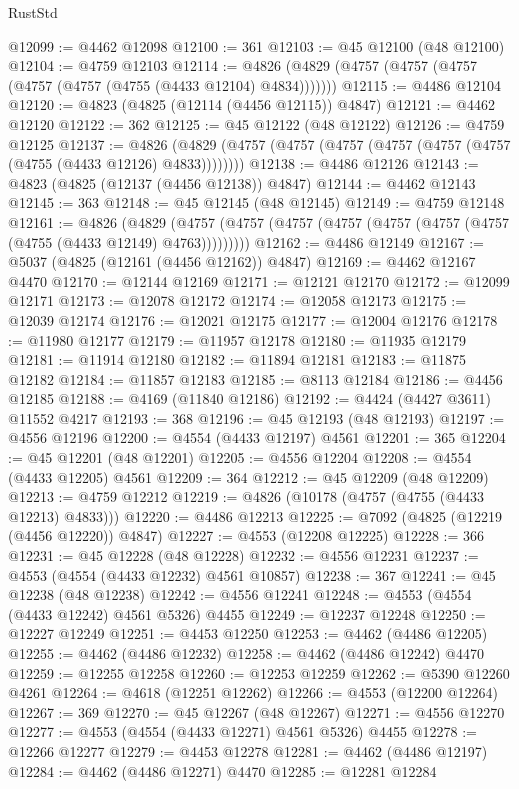 \begin{lexlean}{RustStd}
\begin{coremodule}
@12099 := @4462 @12098
@12100 := 361
@12103 := @45 @12100 (@48 @12100)
@12104 := @4759 @12103
@12114 := @4826 (@4829 (@4757 (@4757 (@4757 (@4757 (@4757 (@4755 (@4433 @12104) @4834)))))))
@12115 := @4486 @12104
@12120 := @4823 (@4825 (@12114 (@4456 @12115)) @4847)
@12121 := @4462 @12120
@12122 := 362
@12125 := @45 @12122 (@48 @12122)
@12126 := @4759 @12125
@12137 := @4826 (@4829 (@4757 (@4757 (@4757 (@4757 (@4757 (@4757 (@4755 (@4433 @12126) @4833))))))))
@12138 := @4486 @12126
@12143 := @4823 (@4825 (@12137 (@4456 @12138)) @4847)
@12144 := @4462 @12143
@12145 := 363
@12148 := @45 @12145 (@48 @12145)
@12149 := @4759 @12148
@12161 := @4826
    (@4829 (@4757 (@4757 (@4757 (@4757 (@4757 (@4757 (@4757 (@4755 (@4433 @12149) @4763)))))))))
@12162 := @4486 @12149
@12167 := @5037 (@4825 (@12161 (@4456 @12162)) @4847)
@12169 := @4462 @12167 @4470
@12170 := @12144 @12169
@12171 := @12121 @12170
@12172 := @12099 @12171
@12173 := @12078 @12172
@12174 := @12058 @12173
@12175 := @12039 @12174
@12176 := @12021 @12175
@12177 := @12004 @12176
@12178 := @11980 @12177
@12179 := @11957 @12178
@12180 := @11935 @12179
@12181 := @11914 @12180
@12182 := @11894 @12181
@12183 := @11875 @12182
@12184 := @11857 @12183
@12185 := @8113 @12184
@12186 := @4456 @12185
@12188 := @4169 (@11840 @12186)
@12192 := @4424 (@4427 @3611) @11552 @4217
@12193 := 368
@12196 := @45 @12193 (@48 @12193)
@12197 := @4556 @12196
@12200 := @4554 (@4433 @12197) @4561
@12201 := 365
@12204 := @45 @12201 (@48 @12201)
@12205 := @4556 @12204
@12208 := @4554 (@4433 @12205) @4561
@12209 := 364
@12212 := @45 @12209 (@48 @12209)
@12213 := @4759 @12212
@12219 := @4826 (@10178 (@4757 (@4755 (@4433 @12213) @4833)))
@12220 := @4486 @12213
@12225 := @7092 (@4825 (@12219 (@4456 @12220)) @4847)
@12227 := @4553 (@12208 @12225)
@12228 := 366
@12231 := @45 @12228 (@48 @12228)
@12232 := @4556 @12231
@12237 := @4553 (@4554 (@4433 @12232) @4561 @10857)
@12238 := 367
@12241 := @45 @12238 (@48 @12238)
@12242 := @4556 @12241
@12248 := @4553 (@4554 (@4433 @12242) @4561 @5326) @4455
@12249 := @12237 @12248
@12250 := @12227 @12249
@12251 := @4453 @12250
@12253 := @4462 (@4486 @12205)
@12255 := @4462 (@4486 @12232)
@12258 := @4462 (@4486 @12242) @4470
@12259 := @12255 @12258
@12260 := @12253 @12259
@12262 := @5390 @12260 @4261
@12264 := @4618 (@12251 @12262)
@12266 := @4553 (@12200 @12264)
@12267 := 369
@12270 := @45 @12267 (@48 @12267)
@12271 := @4556 @12270
@12277 := @4553 (@4554 (@4433 @12271) @4561 @5326) @4455
@12278 := @12266 @12277
@12279 := @4453 @12278
@12281 := @4462 (@4486 @12197)
@12284 := @4462 (@4486 @12271) @4470
@12285 := @12281 @12284

\end{coremodule}
\end{lexlean}

